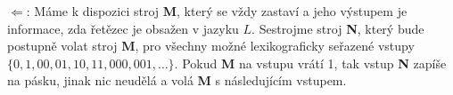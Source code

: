 \documentclass[12pt, a4paper]{article}
\begin{document}
$\Leftarrow$:
Máme k dispozici stroj \textbf{M}, který se vždy zastaví a jeho výstupem je informace, zda řetězec je obsažen v jazyku $L$. Sestrojme stroj \textbf{N}, který bude postupně volat stroj \textbf{M}, pro všechny možné lexikograficky seřazené vstupy $\{0,1,00,01,10,11,000,001,\dots\}$. Pokud \textbf{M} na vstupu vrátí 1, tak vstup \textbf{N} zapíše na pásku, jinak nic neudělá a volá \textbf{M} s následujícím vstupem.
\end{document}
